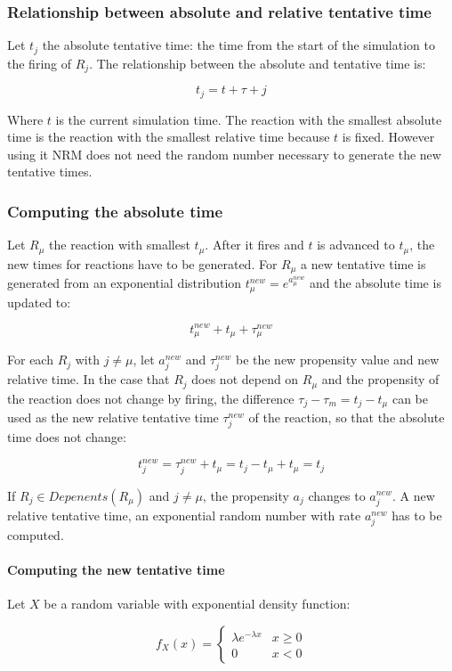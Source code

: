     \subsubsection{Relationship between absolute and relative tentative time}
    Let $t_j$ the absolute tentative time: the time from the start of the simulation to the firing of $R_j$.
    The relationship between the absolute and tentative time is:

    $$t_j = t+\tau+j$$

    Where $t$ is the current simulation time.
    The reaction with the smallest absolute time is the reaction with the smallest relative time because $t$ is fixed.
    However using it NRM does not need the random number necessary to generate the new tentative times.

    \subsubsection{Computing the absolute time}
    Let $R_\mu$ the reaction with smallest $t_\mu$.
    After it fires and $t$ is advanced to $t_\mu$, the new times for reactions have to be generated.
    For $R_\mu$ a new tentative time is generated from an exponential distribution $t_\mu^{new} = e^{a^{new}_\mu}$ and the absolute time is updated to:

    $$t_\mu^{new} + t_\mu + \tau_\mu^{new}$$

    For each $R_j$ with $j\neq\mu$, let $a_j^{new}$ and $\tau_j^{new}$ be the new propensity value and new relative time.
    In the case that $R_j$ does not depend on $R_\mu$ and the propensity of the reaction does not change by firing, the difference $\tau_j-\tau_m = t_j-t_\mu$ can be used as the new relative tentative time $\tau_j^{new}$ of the reaction, so that the absolute time does not change:

    $$t_j^{new} = \tau_{j}^{new} + t_\mu = t_j-t_\mu+t_\mu = t_j$$

    If $R_j\in Depenents(R_\mu)$ and $j\neq\mu$, the propensity $a_j$ changes to $a_j^{new}$.
    A new relative tentative time, an exponential random number with rate $a_j^{new}$ has to be computed.

      \paragraph{Computing the new tentative time}
      Let $X$ be a random variable with exponential density function:

      $$f_X(x) = \begin{cases}\lambda e^{-\lambda x} & x\ge 0\\ 0 &x < 0\end{cases}$$

